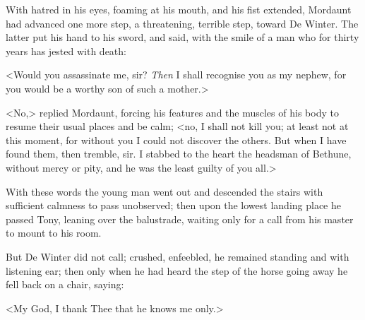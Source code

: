 With hatred in his eyes, foaming at his mouth, and his fist extended, Mordaunt had advanced one more step, a threatening, terrible step, toward De Winter. The latter put his hand to his sword, and said, with the smile of a man who for thirty years has jested with death:

<Would you assassinate me, sir? \textit{Then} I shall recognise you as my nephew, for you would be a worthy son of such a mother.>

<No,> replied Mordaunt, forcing his features and the muscles of his body to resume their usual places and be calm; <no, I shall not kill you; at least not at this moment, for without you I could not discover the others. But when I have found them, then tremble, sir. I stabbed to the heart the headsman of Bethune, without mercy or pity, and he was the least guilty of you all.>

With these words the young man went out and descended the stairs with sufficient calmness to pass unobserved; then upon the lowest landing place he passed Tony, leaning over the balustrade, waiting only for a call from his master to mount to his room.

But De Winter did not call; crushed, enfeebled, he remained standing and with listening ear; then only when he had heard the step of the horse going away he fell back on a chair, saying:

<My God, I thank Thee that he knows me only.> 